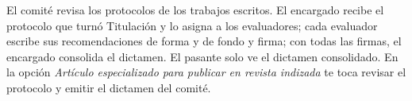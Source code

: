 \documentclass[11pt,a4paper]{article}
\begin{document}
{\small\tableofcontents}
\newpage
\begin{quevasahacer}
El comité revisa los protocolos de los trabajos escritos. El encargado recibe el protocolo que turnó Titulación y lo asigna a los evaluadores; cada evaluador escribe sus recomendaciones de forma y de fondo y firma; con todas las firmas, el encargado consolida el dictamen. El pasante solo ve el dictamen consolidado. En la opción \emph{Artículo especializado para publicar en revista indizada} te toca revisar el protocolo y emitir el dictamen del comité.
\end{quevasahacer}



\end{document}
